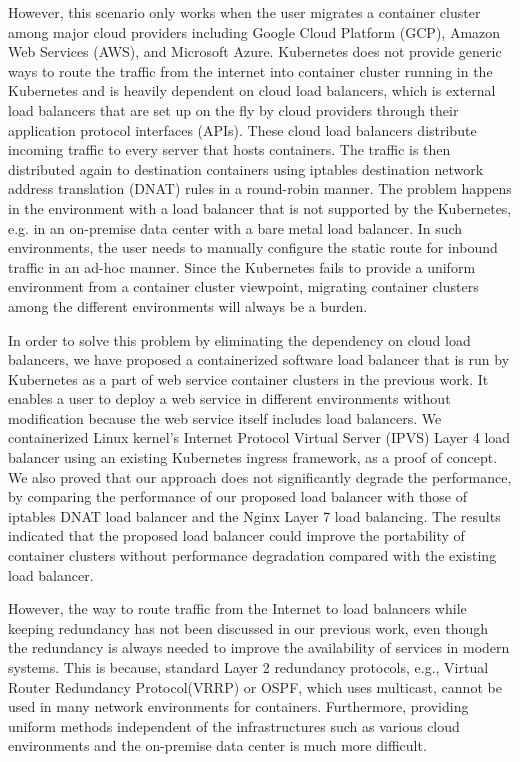 However, this scenario only works when the user migrates a container cluster among major cloud providers including Google Cloud Platform (GCP), 
Amazon Web Services (AWS), and Microsoft Azure.
Kubernetes does not provide generic ways to route the traffic from the internet into container cluster running in the Kubernetes and is 
heavily dependent on cloud load balancers, which is external load balancers that are set up on the fly by cloud providers through their application protocol interfaces (APIs).
%
These cloud load balancers distribute incoming traffic to every server that hosts containers.
The traffic is then distributed again to destination containers using iptables destination 
network address translation (DNAT)\cite{MartinA.Brown2017,Marmol2015} rules in a round-robin manner. 
The problem happens in the environment with a load balancer that is not supported by the Kubernetes, 
e.g. in an on-premise data center with a bare metal load balancer. 
In such environments, the user needs to manually configure 
the static route for inbound traffic in an ad-hoc manner. 
Since the Kubernetes fails to provide a uniform environment from a container cluster viewpoint,
migrating container clusters among the different environments will always be a burden.

In order to solve this problem by eliminating the dependency on cloud load balancers,
we have proposed a containerized software load balancer that is run by Kubernetes as  
a part of web service container clusters in the previous work\cite{takahashi2018portable}.
It enables a user to deploy a web service in different environments without modification because the web service itself includes load balancers.
%
We containerized Linux kernel's Internet Protocol Virtual Server (IPVS)\cite{Zhang2000} 
Layer 4 load balancer using an existing Kubernetes ingress\cite{K8sIngress2017} framework, as a proof of concept.
%
%
We also proved that our approach does not significantly degrade the performance,
by comparing the performance of our proposed load balancer with those of
iptables DNAT load balancer and the Nginx Layer 7 load balancing.
%
The results indicated that the proposed load balancer could improve the portability of container clusters without performance degradation compared with the existing load balancer.

However, the way to route traffic from the Internet to load balancers while keeping redundancy has not been discussed in our previous work, even though the redundancy is always needed to improve the availability of services in modern systems.
This is because, standard Layer 2 redundancy protocols, e.g., Virtual Router Redundancy Protocol(VRRP)\cite{hinden2004virtual}
or OSPF\cite{moy1997ospf}, which uses multicast, cannot be used in many network environments for containers.
Furthermore, providing uniform methods independent of the infrastructures such as various cloud environments and the on-premise data center is much more difficult.

